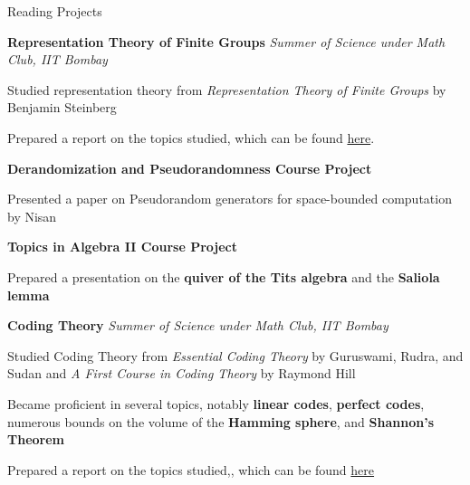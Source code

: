 \begin{rubric}{Reading Projects}

	\entry*[2022] \textbf{Representation Theory of Finite Groups} \hfill \emph{Summer of Science under Math Club, IIT Bombay}

		Studied representation theory from \emph{Representation Theory of Finite Groups} by Benjamin Steinberg

		Prepared a report on the topics studied, which can be found \href{https://amitrajaraman.github.io/notes/rep-th/main.pdf}{here}.

	\entry*[2022\phantom{}] \textbf{Derandomization and Pseudorandomness Course Project}

		Presented a paper on Pseudorandom generators for space-bounded computation by Nisan

	\entry*[2020\phantom{}] \textbf{Topics in Algebra II Course Project}

		Prepared a presentation on the \textbf{quiver of the Tits algebra} and the \textbf{Saliola lemma}

	\entry*[2020] \textbf{Coding Theory} \hfill \emph{Summer of Science under Math Club, IIT Bombay}

		Studied Coding Theory from \textit{Essential Coding Theory} by Guruswami, Rudra, and Sudan and \textit{A First Course in Coding Theory} by Raymond Hill
		
		Became proficient in several topics, notably \textbf{linear codes}, \textbf{perfect codes}, numerous bounds on the volume of the \textbf{Hamming sphere}, and \textbf{Shannon's Theorem}

		Prepared a report on the topics studied,, which can be found \href{https://amitrajaraman.github.io/notes/coding-th/Coding_Theory.pdf}{here}





        
\end{rubric}